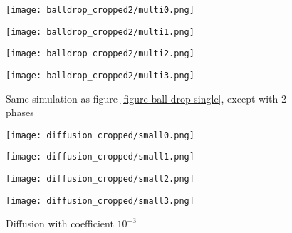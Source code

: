 \begin{figure}[H]
    \centering
    
    \begin{minipage}[t]{.42\linewidth}
        \centering
        \vspace{0pt}
        \texttt{[image: balldrop\_cropped2/multi0.png]}
    \end{minipage}
    \begin{minipage}[t]{.42\linewidth}
        \centering
        \vspace{0pt}
        \texttt{[image: balldrop\_cropped2/multi1.png]}
    \end{minipage}

    \vspace{0.5cm}

    \begin{minipage}[t]{.42\linewidth}
        \centering
        \vspace{0pt}
        \texttt{[image: balldrop\_cropped2/multi2.png]}
    \end{minipage}
    \begin{minipage}[t]{.42\linewidth}
        \centering
        \vspace{0pt}
        \texttt{[image: balldrop\_cropped2/multi3.png]}
    \end{minipage}

    \caption{Same simulation as figure \ref{figure ball drop single}, except with 2 phases}
    \label{figure ball drop multi}
\end{figure}


\begin{figure}[H]
    \centering
    
    \begin{minipage}[t]{.24\linewidth}
        \centering
        \vspace{0pt}
        \texttt{[image: diffusion\_cropped/small0.png]}
    \end{minipage}
    \begin{minipage}[t]{.24\linewidth}
        \centering
        \vspace{0pt}
        \texttt{[image: diffusion\_cropped/small1.png]}
    \end{minipage}
    \begin{minipage}[t]{.24\linewidth}
        \centering
        \vspace{0pt}
        \texttt{[image: diffusion\_cropped/small2.png]}
    \end{minipage}
    \begin{minipage}[t]{.24\linewidth}
        \centering
        \vspace{0pt}
        \texttt{[image: diffusion\_cropped/small3.png]}
    \end{minipage}

    \caption{Diffusion with coefficient $10^{-3}$}
    \label{diffusion 1e-3}
\end{figure}



